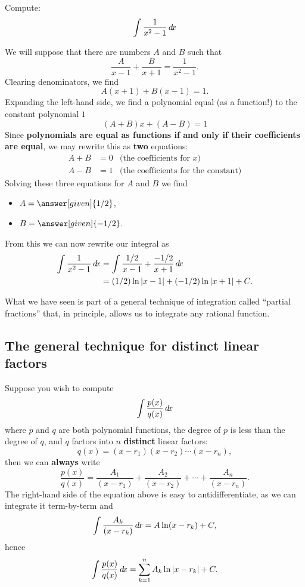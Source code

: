 \documentclass{ximera}
\begin{document}
\begin{example}
  Compute:
  \[
  \int \frac{1}{x^2-1} \mathop{}\!d\! x
  \]
  \begin{explanation}
    We will suppose that there are numbers $A$ and $B$ such that
    \[
    \frac{A}{x-1} + \frac{B}{x+1} = \frac{1}{x^2-1}.
    \]
    Clearing denominators, we find
    \[
    A(x+1) + B(x-1) = 1.
    \]
    Expanding the left-hand side, we find a polynomial equal (as a
    function!) to the constant polynomial $1$
    \[
    (A+ B)x + (A-B) = 1
    \]
    Since \textbf{polynomials are equal as functions if and only if
      their coefficients are equal}, we may rewrite this as
    \textbf{two} equations:
    \begin{align*}
      A+B &= 0 &\text{(the coefficients for $x$)}\\
      A-B &= 1 &\text{(the coefficients for the constant)}
    \end{align*}
    Solving these three equations for $A$ and $B$ we find
    \begin{itemize}
    \item $A = \answer[given]{1/2}$,
    \item $B = \answer[given]{-1/2}$.
    \end{itemize} 
    From this we can now rewrite our integral as
    \begin{align*}
      \int \frac{1}{x^2-1} \mathop{}\!d\! x &=  \int \frac{1/2}{x-1} + \frac{-1/2}{x+1} \mathop{}\!d\! x\\
      &= (1/2)\ln|x-1| + (-1/2)\ln|x+1|+ C.
    \end{align*}
  \end{explanation}
\end{example}

What we have seen is part of a general technique of integration called
``partial fractions'' that, in principle,
allows us to integrate any rational function.

\subsection{The general technique for distinct linear factors}

Suppose you wish to compute
\[
\int \frac{p(x)}{q(x)} \mathop{}\!d\! x
\]
where $p$ and $q$ are both polynomial functions, the degree of $p$ is
less than the degree of $q$, and $q$ factors into $n$
\textbf{distinct} linear factors:
\[
q(x) = (x-r_1) (x-r_2) \cdots (x-r_n),
\]
then we can \textbf{always} write
\[
\frac{p(x)}{q(x)}  = \frac{A_1}{(x-r_1)} + \frac{A_2}{(x-r_2)} + \cdots + \frac{A_n}{(x-r_n)}. 
\]
The right-hand side of the equation above is easy to antidifferentiate,
as we can integrate it term-by-term and
\[
\int \frac{A_k}{(x-r_k)} \mathop{}\!d\! x = A \ln(x-r_k) + C,
\]
hence
\[
\int \frac{p(x)}{q(x)} \mathop{}\!d\! x = \sum_{k=1}^n A_k \ln|x-r_k| +C.
\]
\end{document}
